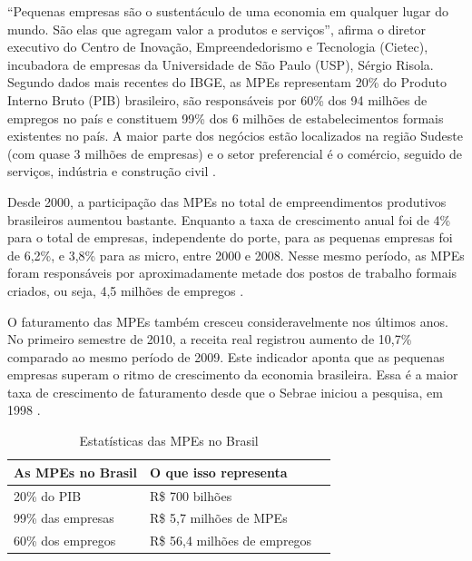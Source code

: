 “Pequenas empresas são o sustentáculo de uma economia em qualquer lugar do mundo. São elas que agregam valor a produtos e serviços”, afirma o diretor executivo do Centro de Inovação, Empreendedorismo e Tecnologia (Cietec), incubadora de empresas da Universidade de São Paulo (USP), Sérgio Risola. Segundo dados mais recentes do IBGE, as MPEs representam 20\% do Produto Interno Bruto (PIB) brasileiro, são responsáveis por 60\% dos 94 milhões de empregos no país e constituem 99\% dos 6 milhões de estabelecimentos formais existentes no país. A maior parte dos negócios estão localizados na região Sudeste (com quase 3 milhões de empresas) e o setor preferencial é o comércio, seguido de serviços, indústria e construção civil \cite{PORTALBRASIL}.

Desde 2000, a participação das MPEs no total de empreendimentos produtivos brasileiros aumentou bastante. Enquanto a taxa de crescimento anual foi de 4\% para o total de empresas, independente do porte, para as pequenas empresas foi de 6,2\%, e 3,8\% para as micro, entre 2000 e 2008. Nesse mesmo período, as MPEs foram responsáveis por aproximadamente metade dos postos de trabalho formais criados, ou seja, 4,5 milhões de empregos \cite{PORTALBRASIL}.

O faturamento das MPEs também cresceu consideravelmente nos últimos anos. No primeiro semestre de 2010, a receita real registrou aumento de 10,7\% comparado ao mesmo período de 2009. Este indicador aponta que as pequenas empresas superam o ritmo de crescimento da economia brasileira. Essa é a maior taxa de crescimento de faturamento desde que o Sebrae iniciou a pesquisa, em 1998 \cite{PORTALBRASIL}.

\begin{table}[!htpb]
 \centering
    \begin{tabular}{|l|p{5cm}|c|} 
    \hline
        \textbf{As MPEs no Brasil} & \textbf{O que isso representa} \\
    \hline
        20\% do PIB & R\$ 700 bilhões \\
    \hline
        99\% das empresas & R\$ 5,7 milhões de MPEs \\
    \hline
        60\% dos empregos & R\$ 56,4 milhões de empregos \\
    \hline
    \end{tabular}
    \caption{Estatísticas das MPEs no Brasil}
    \label{t_fixa}
\end{table}